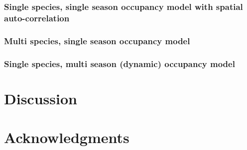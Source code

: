 \documentclass[12pt]{article}
\begin{document}
\subsubsection*{Single species, single season occupancy model with
  spatial auto-correlation}


\subsubsection*{Multi species, single season occupancy model}
\label{sec:msss}

\subsubsection*{Single species, multi season (dynamic) occupancy
  model}

\section*{Discussion}
\label{sec:discussion}

\section*{Acknowledgments}
\label{sec:acknowledge}





\end{document}
